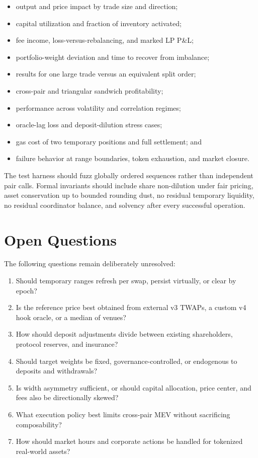 \documentclass[11pt]{article}
\begin{document}
\begin{itemize}
  \item output and price impact by trade size and direction;
  \item capital utilization and fraction of inventory activated;
  \item fee income, loss-versus-rebalancing, and marked LP P\&L;
  \item portfolio-weight deviation and time to recover from imbalance;
  \item results for one large trade versus an equivalent split order;
  \item cross-pair and triangular sandwich profitability;
  \item performance across volatility and correlation regimes;
  \item oracle-lag loss and deposit-dilution stress cases;
  \item gas cost of two temporary positions and full settlement; and
  \item failure behavior at range boundaries, token exhaustion, and market
        closure.
\end{itemize}

The test harness should fuzz globally ordered sequences rather than independent
pair calls. Formal invariants should include share non-dilution under fair
pricing, asset conservation up to bounded rounding dust, no residual temporary
liquidity, no residual coordinator balance, and solvency after every successful
operation.

\section{Open Questions}

The following questions remain deliberately unresolved:

\begin{enumerate}
  \item Should temporary ranges refresh per swap, persist virtually, or clear
        by epoch?
  \item Is the reference price best obtained from external v3 TWAPs, a custom
        v4 hook oracle, or a median of venues?
  \item How should deposit adjustments divide between existing shareholders,
        protocol reserves, and insurance?
  \item Should target weights be fixed, governance-controlled, or endogenous to
        deposits and withdrawals?
  \item Is width asymmetry sufficient, or should capital allocation, price
        center, and fees also be directionally skewed?
  \item What execution policy best limits cross-pair MEV without sacrificing
        composability?
  \item How should market hours and corporate actions be handled for tokenized
        real-world assets?
\end{enumerate}
\end{document}
